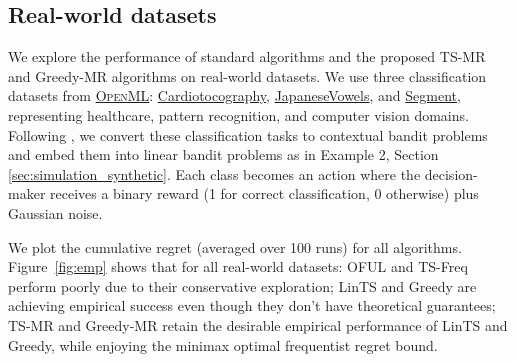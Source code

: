 \subsection{Real-world datasets}
\label{sec:simulation_real_world}
We explore the performance of standard \POFUL{} algorithms and the proposed TS-MR and Greedy-MR algorithms on real-world datasets. We use three classification datasets from \href{https://www.openml.org/}{\textsc{OpenML}}: \href{https://www.openml.org/d/1466}{Cardiotocography}, \href{https://www.openml.org/d/375}{JapaneseVowels}, and \href{https://www.openml.org/d/36}{Segment}, representing healthcare, pattern recognition, and computer vision domains. Following \citet{bietti2021contextual, bastani2021mostly}, we convert these classification tasks to contextual bandit problems and embed them into linear bandit problems as in Example 2, Section \ref{sec:simulation_synthetic}. Each class becomes an action where the decision-maker receives a binary reward (1 for correct classification, 0 otherwise) plus Gaussian noise.

We plot the cumulative regret (averaged over 100 runs) for all algorithms.   Figure~\ref{fig:emp} shows that for all real-world datasets: OFUL and TS-Freq perform poorly due to their conservative exploration; LinTS and Greedy are achieving empirical success even though they don't have theoretical guarantees; TS-MR and Greedy-MR retain the desirable empirical performance of LinTS and Greedy, while enjoying the minimax optimal frequentist regret bound.

